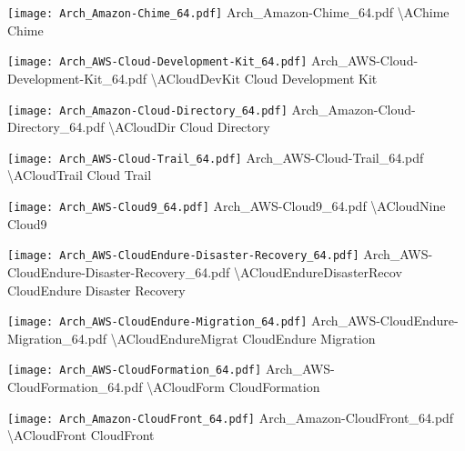  {\texttt{[image: Arch\_Amazon-Chime\_64.pdf]}} {Arch\_Amazon-Chime\_64.pdf} {{\textbackslash}AChime} {Chime}

 {\texttt{[image: Arch\_AWS-Cloud-Development-Kit\_64.pdf]}} {Arch\_AWS-Cloud-Development-Kit\_64.pdf} {{\textbackslash}ACloudDevKit} {Cloud Development Kit}

 {\texttt{[image: Arch\_Amazon-Cloud-Directory\_64.pdf]}} {Arch\_Amazon-Cloud-Directory\_64.pdf} {{\textbackslash}ACloudDir} {Cloud Directory}

 {\texttt{[image: Arch\_AWS-Cloud-Trail\_64.pdf]}} {Arch\_AWS-Cloud-Trail\_64.pdf} {{\textbackslash}ACloudTrail} {Cloud Trail}

 {\texttt{[image: Arch\_AWS-Cloud9\_64.pdf]}} {Arch\_AWS-Cloud9\_64.pdf} {{\textbackslash}ACloudNine} {Cloud9}

 {\texttt{[image: Arch\_AWS-CloudEndure-Disaster-Recovery\_64.pdf]}} {Arch\_AWS-CloudEndure-Disaster-Recovery\_64.pdf} {{\textbackslash}ACloudEndureDisasterRecov} {CloudEndure Disaster Recovery}

 {\texttt{[image: Arch\_AWS-CloudEndure-Migration\_64.pdf]}} {Arch\_AWS-CloudEndure-Migration\_64.pdf} {{\textbackslash}ACloudEndureMigrat} {CloudEndure Migration}

 {\texttt{[image: Arch\_AWS-CloudFormation\_64.pdf]}} {Arch\_AWS-CloudFormation\_64.pdf} {{\textbackslash}ACloudForm} {CloudFormation}

 {\texttt{[image: Arch\_Amazon-CloudFront\_64.pdf]}} {Arch\_Amazon-CloudFront\_64.pdf} {{\textbackslash}ACloudFront} {CloudFront}

